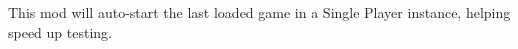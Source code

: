 This mod will auto-\/start the last loaded game in a Single Player instance, helping speed up testing. 